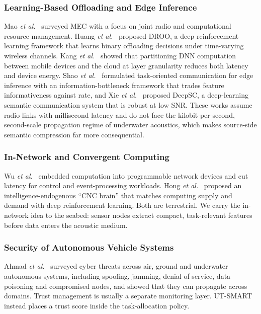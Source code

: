\documentclass[lettersize,journal]{IEEEtran}
\begin{document}
\subsubsection{Learning-Based Offloading and Edge Inference}
Mao \emph{et al.}~\cite{mao2017mec} surveyed MEC with a focus on joint radio and computational resource management. Huang \emph{et al.}~\cite{huang2020droo} proposed DROO, a deep reinforcement learning framework that learns binary offloading decisions under time-varying wireless channels. Kang \emph{et al.}~\cite{kang2017neurosurgeon} showed that partitioning DNN computation between mobile devices and the cloud at layer granularity reduces both latency and device energy. Shao \emph{et al.}~\cite{shao2022taskoriented} formulated task-oriented communication for edge inference with an information-bottleneck framework that trades feature informativeness against rate, and Xie \emph{et al.}~\cite{xie2021deepsc} proposed DeepSC, a deep-learning semantic communication system that is robust at low SNR. These works assume radio links with millisecond latency and do not face the kilobit-per-second, second-scale propagation regime of underwater acoustics, which makes source-side semantic compression far more consequential.

\subsubsection{In-Network and Convergent Computing}
Wu \emph{et al.}~\cite{wu2024inc} embedded computation into programmable network devices and cut latency for control and event-processing workloads. Hong \emph{et al.}~\cite{hong2024cnc} proposed an intelligence-endogenous ``CNC brain'' that matches computing supply and demand with deep reinforcement learning. Both are terrestrial. We carry the in-network idea to the seabed: sensor nodes extract compact, task-relevant features before data enters the acoustic medium.

\subsubsection{Security of Autonomous Vehicle Systems}
Ahmad \emph{et al.}~\cite{ahmad2026survey} surveyed cyber threats across air, ground and underwater autonomous systems, including spoofing, jamming, denial of service, data poisoning and compromised nodes, and showed that they can propagate across domains. Trust management is usually a separate monitoring layer. UT-SMART instead places a trust score inside the task-allocation policy.
\end{document}
